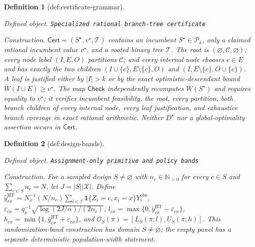 \documentclass{article}
\newtheorem{definition}{Definition}
\begin{document}
\begin{definition}[def:certificate-grammar]\label{def:certificate-grammar}
\par\smallskip\noindent\emph{Defined object.} \texttt{Specialized rational branch-\allowbreak{}tree certificate}
\par\smallskip\noindent\emph{Construction.} \(\mathsf{Cert}=(S^{\star},v^{\star},\mathcal T)\) contains an incumbent \(S^{\star}\in\mathcal P_k\), only a claimed rational incumbent value \(v^{\star}\), and a rooted binary tree \(\mathcal T\). The root is \((\varnothing,\mathcal C,\varnothing)\); every node label \((I,E,O)\) partitions \(\mathcal C\); and every internal node chooses \(c\in E\) and has exactly the two children \((I\cup\{c\},E\setminus\{c\},O)\) and \((I,E\setminus\{c\},O\cup\{c\})\). A leaf is justified either by \(|I|>k\) or by the exact optimistic-descendant bound \(\overline W(I\cup E)\geq v^{\star}\). The map \(\mathsf{Check}\) independently recomputes \(\overline W(S^{\star})\) and requires equality to \(v^{\star}\); it verifies incumbent feasibility, the root, every partition, both branch children of every internal node, every leaf justification, and exhaustive branch coverage in exact rational arithmetic. Neither \(D^{\star}\) nor a global-optimality assertion occurs in \(\mathsf{Cert}\).
\end{definition}

\begin{definition}[def:design-bands]\label{def:design-bands}
\par\smallskip\noindent\emph{Defined object.} \texttt{Assignment-\allowbreak{}only primitive and policy bands}
\par\smallskip\noindent\emph{Construction.} For a sampled design \(S\neq\varnothing\) with \(n_c\in\mathbb N_{>0}\) for every \(c\in S\) and \(\sum_{c\in S}n_c=N\), let \(J=|S||\mathcal X|\). Define \(\widehat y_{cx}^{\mathrm{HT}}=N_x^{-1}(N/n_c)\sum_{i\in\mathcal I}\mathbf1\{Z_i=c,x_i=x\}Y_i^{\mathrm{obs}}\), \(\varepsilon_{cx}=q_x^{-1}\sqrt{\log(2J/\alpha)/(2n_c)}\), \(l_{cx}=\max\{0,\widehat y_{cx}^{\mathrm{HT}}-\varepsilon_{cx}\}\), \(h_{cx}=\min\{1,\widehat y_{cx}^{\mathrm{HT}}+\varepsilon_{cx}\}\), and \(\mathcal O_S(\pi)=[L_S(\pi;l),U_S(\pi;h)]\). This randomization-band construction has domain \(S\neq\varnothing\); the empty panel has a separate deterministic population-width statement.
\end{definition}
\end{document}
